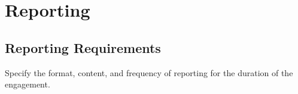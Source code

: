 \section*{Reporting}

\subsection*{   Reporting Requirements}
        Specify the format, content, and frequency of reporting for the duration of the engagement.
